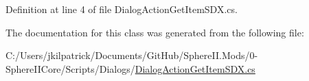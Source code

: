 Definition at line 4 of file Dialog\+Action\+Get\+Item\+S\+D\+X.\+cs.



The documentation for this class was generated from the following file\+:\begin{DoxyCompactItemize}
\item 
C\+:/\+Users/jkilpatrick/\+Documents/\+Git\+Hub/\+Sphere\+I\+I.\+Mods/0-\/\+Sphere\+I\+I\+Core/\+Scripts/\+Dialogs/\mbox{\hyperlink{_dialog_action_get_item_s_d_x_8cs}{Dialog\+Action\+Get\+Item\+S\+D\+X.\+cs}}\end{DoxyCompactItemize}
